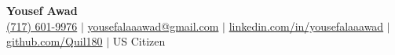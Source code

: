 \documentclass[letterpaper,10pt]{article}
\begin{document}
\begin{center}
    \textbf{\Huge Yousef Awad} \\ \vspace{1pt}
		\small \href{tel:17176019976}{{(717) 601-9976}} $|$
    \small \href{mailto:yousefalaaawad@gmail.com}{{yousefalaaawad@gmail.com}} $|$ 
    \href{https://www.linkedin.com/in/yousefalaaawad}{{linkedin.com/in/yousefalaaawad}} $|$
    \href{https://www.github.com/Quil180}{{github.com/Quil180}} $|$
    US Citizen
\end{center}






\end{document}
